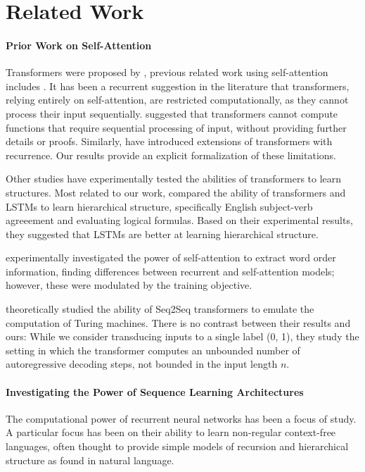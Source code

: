 \documentclass[11pt,a4paper]{article}
\begin{document}
\section{Related Work}
\paragraph{Prior Work on Self-Attention}
Transformers were proposed by \cite{vaswani2017attention}, previous related work using self-attention includes \cite{cheng2016long,parikh2016decomposable,paulus2017deep,lin2017structured}.
It has been a recurrent suggestion in the literature that transformers, relying entirely on self-attention, are restricted computationally, as they cannot process their input sequentially.
\cite{dehghani2018universal} suggested that %
transformers cannot compute functions that require sequential processing of input, without providing further details or proofs.
Similarly, \cite{shen2018disan,chen2018best,hao2019modeling} have introduced extensions of transformers with recurrence.
Our results provide an explicit formalization of these limitations.

Other studies have experimentally tested the abilities of transformers to learn structures.
Most related to our work, \cite{tran2018importance} compared the ability of transformers and LSTMs to learn hierarchical structure, specifically English subject-verb agreeement and evaluating logical formulas.
Based on their experimental results, they suggested that LSTMs are better at learning hierarchical structure.

\cite{yang2019assessing} experimentally investigated the power of self-attention to extract word order information, finding differences between recurrent and self-attention models; however, these were modulated by the training objective.

\cite{perez2019turing} theoretically studied the ability of Seq2Seq transformers to emulate the computation of Turing machines.
There is no contrast between their results and ours: While we consider transducing inputs to a single label (0, 1), they study the setting in which the transformer computes an unbounded number of autoregressive decoding steps, not bounded in the input length $n$.


\paragraph{Investigating the Power of Sequence Learning Architectures}
The computational power of recurrent neural networks has been a focus of study.
A particular focus has been on their ability to learn non-regular context-free languages, often thought to provide simple models of recursion and hierarchical structure as found in natural language.
\end{document}
